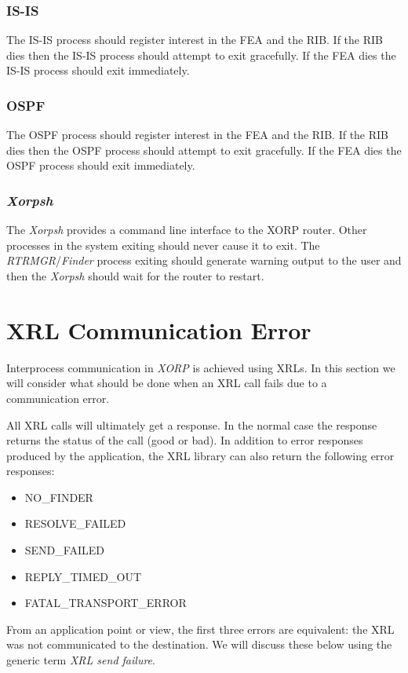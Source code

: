 \documentclass[11pt]{article}
\makeatletter
\newcommand{\xorp} {{\em XORP}\@\xspace}
\newcommand{\finder} {{\em Finder}\@\xspace}
\newcommand{\xorpsh} {{\em Xorpsh}\@\xspace}
\newcommand{\rtrmgr} {{\em RTRMGR}\@\xspace}
\makeatother
\begin{document}
\subsubsection{IS-IS}

The IS-IS process should register interest in the FEA and the RIB. If
the RIB dies then the IS-IS process should attempt to exit gracefully.
If the FEA dies the IS-IS process should exit immediately.

\subsubsection{OSPF}

The OSPF process should register interest in the FEA and the RIB. If
the RIB dies then the OSPF process should attempt to exit gracefully.
If the FEA dies the OSPF process should exit immediately.

\subsubsection{\label{xorpsh}\xorpsh}

The \xorpsh provides a command line interface to the XORP router.
Other processes in the system exiting should never cause it to
exit. The \rtrmgr/\finder process exiting should generate
warning output to the user and then the \xorpsh should wait for the
router to restart.

\section{XRL Communication Error}
Interprocess communication in \xorp is achieved using XRLs. In this
section we will consider what should be done when an XRL call fails
due to a communication error.

All XRL calls will ultimately get a response. In the normal case the
response returns the status of the call (good or bad). In addition to
error responses produced by the application, the XRL library can also
return the following error responses:
\begin{itemize}
\item NO\_FINDER
\item RESOLVE\_FAILED
\item SEND\_FAILED
\item REPLY\_TIMED\_OUT
\item FATAL\_TRANSPORT\_ERROR
\end{itemize}
From an application point or view, the first three errors are
equivalent: the XRL was not communicated to the destination.  We will
discuss these below using the generic term {\em XRL send failure}.
\end{document}
